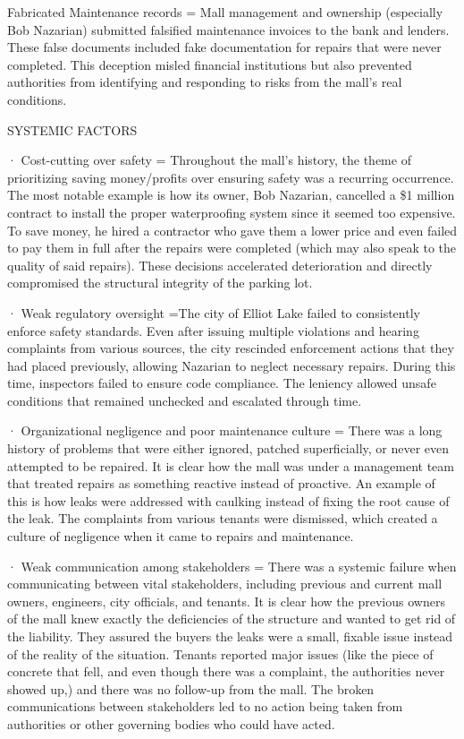 \documentclass[12pt]{article}
\begin{document}
 

 
Fabricated Maintenance records = Mall management and ownership (especially Bob Nazarian) submitted falsified maintenance invoices to the bank and lenders. These false documents included fake documentation for repairs that were never completed. This deception misled financial institutions but also prevented authorities from identifying and responding to risks from the mall's real conditions.


SYSTEMIC FACTORS

· Cost-cutting over safety = Throughout the mall's history, the theme of prioritizing saving money/profits over ensuring safety was a recurring occurrence. The most notable example is how its owner, Bob Nazarian, cancelled a \$1 million contract to install the proper waterproofing system since it seemed too expensive. To save money, he hired a contractor who gave them a lower price and even failed to pay them in full after the repairs were completed (which may also speak to the quality of said repairs). These decisions accelerated deterioration and directly compromised the structural integrity of the parking lot.

 

 · Weak regulatory oversight =The city of Elliot Lake failed to consistently enforce safety standards. Even after issuing multiple violations and hearing complaints from various sources, the city rescinded enforcement actions that they had placed previously, allowing Nazarian to neglect necessary repairs. During this time, inspectors failed to ensure code compliance. The leniency allowed unsafe conditions that remained unchecked and escalated through time.

 

 · Organizational negligence and poor maintenance culture = There was a long history of problems that were either ignored, patched superficially, or never even attempted to be repaired. It is clear how the mall was under a management team that treated repairs as something reactive instead of proactive. An example of this is how leaks were addressed with caulking instead of fixing the root cause of the leak. The complaints from various tenants were dismissed, which created a culture of negligence when it came to repairs and maintenance.

 

 · Weak communication among stakeholders = There was a systemic failure when communicating between vital stakeholders, including previous and current mall owners, engineers, city officials, and tenants. It is clear how the previous owners of the mall knew exactly the deficiencies of the structure and wanted to get rid of the liability. They assured the buyers the leaks were a small, fixable issue instead of the reality of the situation. Tenants reported major issues (like the piece of concrete that fell, and even though there was a complaint, the authorities never showed up,) and there was no follow-up from the mall. The broken communications between stakeholders led to no action being taken from authorities or other governing bodies who could have acted.
\end{document}
